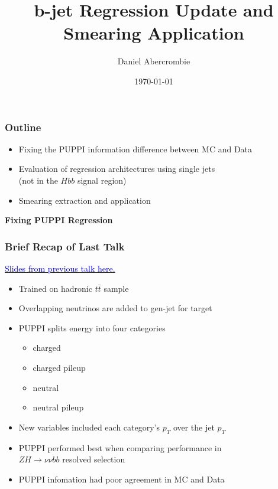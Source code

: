 \documentclass{beamer}
\author[D. Abercrombie]{
  Daniel Abercrombie
}
\title{\bf \sffamily b-jet Regression Update and Smearing Application}
\date{\today}
\newcommand{\link}[2]{\href{#2}{\textcolor{blue}{\underline{#1}}}}
\begin{document}
\begin{frame}
  \titlepage
\end{frame}

\begin{frame}
  \frametitle{Outline}

  \begin{itemize}
  \item Fixing the PUPPI information difference between MC and Data
  \item Evaluation of regression architectures using single jets \\
    (not in the $Hbb$ signal region)
  \item Smearing extraction and application
  \end{itemize}

\end{frame}


\begin{frame}
  \centering
    {\Huge \bf\sffamily Fixing PUPPI Regression}
\end{frame}


\begin{frame}
  \frametitle{Brief Recap of Last Talk}
  \link{Slides from previous talk here.}
       {https://indico.cern.ch/event/788750/contributions/3529492/attachments/1893446/3123086/dabercro_hbb_190814.pdf}

  \begin{itemize}
  \item Trained on hadronic $t\bar{t}$ sample
  \item Overlapping neutrinos are added to gen-jet for target
  \item PUPPI splits energy into four categories
    \begin{itemize}
    \item charged
    \item charged pileup
    \item neutral
    \item neutral pileup
    \end{itemize}
  \item New variables included each category's $p_T$ over the jet $p_T$
  \item PUPPI performed best when comparing performance in \\
    $ZH \rightarrow \nu\nu bb$ resolved selection
  \item PUPPI infomation had poor agreement in MC and Data
  \end{itemize}

\end{frame}
\end{document}
